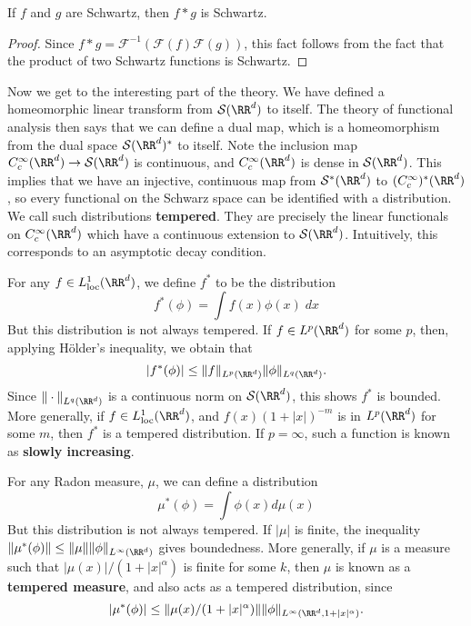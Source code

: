 \begin{corollary}
    If $f$ and $g$ are Schwartz, then $f * g$ is Schwartz.
\end{corollary}
\begin{proof}
    Since $f * g = \mathcal{F}^{-1}(\mathcal{F}(f) \mathcal{F}(g))$, this fact follows from the fact that the product of two Schwartz functions is Schwartz.
\end{proof}

Now we get to the interesting part of the theory. We have defined a homeomorphic linear transform from $\mathcal{S}(\RR^d)$ to itself. The theory of functional analysis then says that we can define a dual map, which is a homeomorphism from the dual space $\mathcal{S}(\RR^d)^*$ to itself. Note the inclusion map $C_c^\infty(\RR^d) \to \mathcal{S}(\RR^d)$ is continuous, and $C_c^\infty(\RR^d)$ is dense in $\mathcal{S}(\RR^d)$. This implies that we have an injective, continuous map from $\mathcal{S}^*(\RR^d)$ to $(C_c^\infty)^*(\RR^d)$, so every functional on the Schwarz space can be identified with a distribution. We call such distributions {\bf tempered}. They are precisely the linear functionals on $C_c^\infty(\RR^d)$ which have a continuous extension to $\mathcal{S}(\RR^d)$. Intuitively, this corresponds to an asymptotic decay condition.

\begin{example}
    For any $f \in L^1_{\text{loc}}(\RR^d)$, we define $f^*$ to be the distribution
    \[ f^*(\phi) = \int f(x) \phi(x)\; dx \]
    But this distribution is not always tempered. If $f \in L^p(\RR^d)$ for some $p$, then, applying H\"{o}lder's inequality, we obtain that
    \[ |f^*(\phi)| \leq \| f \|_{L^p(\RR^d)} \| \phi \|_{L^q(\RR^d)}. \]
    Since $\| \cdot \|_{L^q(\RR^d)}$ is a continuous norm on $\mathcal{S}(\RR^d)$, this shows $f^*$ is bounded. More generally, if $f \in L^1_{\text{loc}}(\RR^d)$, and $f(x) (1 + |x|)^{-m}$ is in $L^p(\RR^d)$ for some $m$, then $f^*$ is a tempered distribution. If $p = \infty$, such a function is known as {\bf slowly increasing}.
\end{example}

\begin{example}
    For any Radon measure, $\mu$, we can define a distribution
    \[ \mu^*(\phi) = \int \phi(x) d\mu(x) \]
    But this distribution is not always tempered. If $|\mu|$ is finite, the inequality $\| \mu^*(\phi) \| \leq \| \mu \| \| \phi \|_{L^\infty(\RR^d)}$ gives boundedness. More generally, if $\mu$ is a measure such that $|\mu(x)|/(1 + |x|^\alpha)$ is finite for some $k$, then $\mu$ is known as a {\bf tempered measure}, and also acts as a tempered distribution, since
    \[ |\mu^*(\phi)| \leq \| \mu(x)/(1 + |x|^\alpha) \| \| \phi \|_{L^\infty(\RR^d, 1 + |x|^\alpha)}. \]
\end{example}


